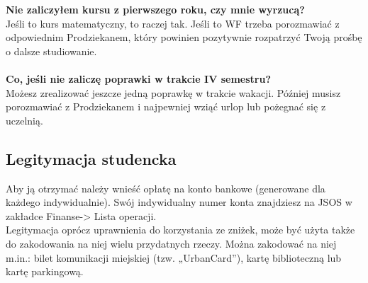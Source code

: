 \documentclass[11pt]{article}
\begin{document}
\textbf{Nie zaliczyłem kursu z pierwszego roku, czy mnie wyrzucą?}\\
\indent Jeśli to kurs matematyczny, to raczej tak. Jeśli to WF trzeba porozmawiać z odpowiednim Prodziekanem, który powinien pozytywnie rozpatrzyć Twoją prośbę o dalsze studiowanie. \\\\
\textbf{Co, jeśli nie zaliczę poprawki w trakcie IV semestru?}\\
\indent Możesz zrealizować jeszcze jedną poprawkę w trakcie wakacji. Później musisz porozmawiać z Prodziekanem i najpewniej wziąć urlop lub pożegnać się z uczelnią.

\subsection{Legitymacja studencka}
\indent \hspace{0.5cm} Aby ją otrzymać należy wnieść opłatę na konto bankowe (generowane dla każdego indywidualnie). Swój indywidualny numer konta znajdziesz na JSOS w zakładce Finanse-> Lista operacji. \\
\indent Legitymacja oprócz uprawnienia do korzystania ze zniżek, może być użyta także do zakodowania na niej wielu przydatnych rzeczy. Można zakodować na niej m.in.: bilet komunikacji miejskiej (tzw. „UrbanCard”), kartę biblioteczną lub kartę parkingową.
\end{document}
